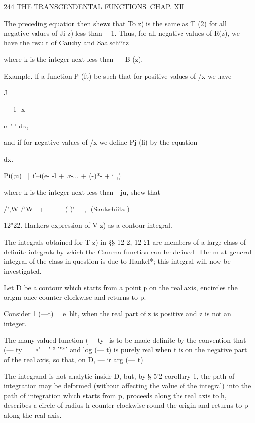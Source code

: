 244 THE TRANSCENDENTAL FUNCTIONS [CHAP. XII

The preceding equation then shews that To z) is the same as T (2) for
all negative values of Ji z) less than —1. Thus, for all negative
values of R(z), we have the result of Cauchy and Saalschiitz

where k is the integer next less than — B (z).

Example. If a function P (ft) be such that for positive values of /x
we have



J



— 1 -x



e~'-' dx,



and if for negative values of /x we define Pj (fi) by the equation

dx.



Pi(;u)=|\ i'--i(e- -l + .r-... + (-)*- + i ,)



where k is the integer next less than - ju, shew that

/',W./'W-l + -... + (-)'--.- ,. (Saalschiitz.)

12"22. Hankers expression of V z) as a contour integral.

The integrals obtained for T z) in §§ 12-2, 12-21 are members of a
large class of definite integrals by which the Gamma-function can be
defined. The most general integral of the class in question is due to
Hankel*; this integral will now be investigated.

Let D be a contour which starts from a point p on the real axis,
encircles the origin once counter-clockwise and returns to p.

Consider 1 (—t)~~ e~hlt, when the real part of z is positive and z is
not an integer.

The many-valued function (— ty~ is to be made definite by the
convention that (— ty~ = e' ~ ' ° '"*' and log (— t) is purely real
when t is on the negative part of the real axis, so that, on D, — ir %
arg (— t) %

The integrand is not analytic inside D, but, by § 5'2 corollary 1, the
path of integration may be deformed (without affecting the value of
the integral) into the path of integration which starts from p,
proceeds along the real axis to h, describes a circle of radius h
counter-clockwise round the origin and returns to p along the real
axis.

